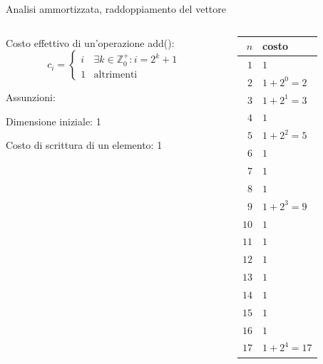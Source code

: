 \begin{frame}{Analisi ammortizzata, raddoppiamento del vettore}

\begin{columns}[T]
\begin{column}{0.6\textwidth}
\alert{Costo effettivo di un'operazione \textsf{add}()}:
\[
c_i = \begin{cases} 
     i & \textrm{$\exists k \in \mathbb{Z}^{+}_0: i=2^k+1$}\\
     1 & \textrm{altrimenti}
  \end{cases}
\]

\bigskip
Assunzioni:
\BI
\item Dimensione iniziale: 1
\item Costo di scrittura di un elemento: 1
\EI

\end{column}
\hfill
\begin{column}{0.30\textwidth}
{\footnotesize
\begin{tabular}{|r|l|}
\hline
$n$ & costo \\
\hline
$1$ & $1$ \\
$2$ & $1 + 2^0 = 2$ \\
$3$ & $1 + 2^1 = 3$ \\
$4$ & $1$ \\
$5$ & $1 + 2^2 = 5$\\
$6$ & $1$ \\
$7$ & $1$ \\
$8$ & $1$ \\
$9$ & $1 + 2^3 = 9$ \\
$10$ & $1$ \\
$11$ & $1$ \\
$12$ & $1$ \\
$13$ & $1$ \\
$14$ & $1$ \\
$15$ & $1$ \\
$16$ & $1$ \\
$17$ & $1 + 2^4 = 17$ \\
\hline
\end{tabular}
}
\end{column}
\end{columns}


\end{frame}

